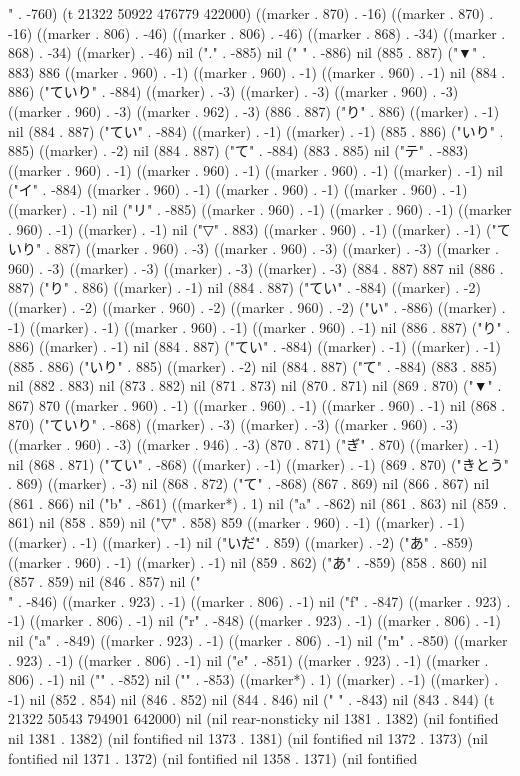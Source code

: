 " . -760) (t 21322 50922 476779 422000) ((marker . 870) . -16) ((marker . 870) . -16) ((marker . 806) . -46) ((marker . 806) . -46) ((marker . 868) . -34) ((marker . 868) . -34) ((marker) . -46) nil ("." . -885) nil (" " . -886) nil (885 . 887) ("▼" . 883) 886 ((marker . 960) . -1) ((marker . 960) . -1) ((marker . 960) . -1) nil (884 . 886) ("ていり" . -884) ((marker) . -3) ((marker) . -3) ((marker . 960) . -3) ((marker . 960) . -3) ((marker . 962) . -3) (886 . 887) ("り" . 886) ((marker) . -1) nil (884 . 887) ("てい" . -884) ((marker) . -1) ((marker) . -1) (885 . 886) ("いり" . 885) ((marker) . -2) nil (884 . 887) ("て" . -884) (883 . 885) nil ("テ" . -883) ((marker . 960) . -1) ((marker . 960) . -1) ((marker . 960) . -1) ((marker) . -1) nil ("イ" . -884) ((marker . 960) . -1) ((marker . 960) . -1) ((marker . 960) . -1) ((marker) . -1) nil ("リ" . -885) ((marker . 960) . -1) ((marker . 960) . -1) ((marker . 960) . -1) ((marker) . -1) nil ("▽" . 883) ((marker . 960) . -1) ((marker) . -1) ("ていり" . 887) ((marker . 960) . -3) ((marker . 960) . -3) ((marker) . -3) ((marker . 960) . -3) ((marker) . -3) ((marker) . -3) ((marker) . -3) (884 . 887) 887 nil (886 . 887) ("り" . 886) ((marker) . -1) nil (884 . 887) ("てい" . -884) ((marker) . -2) ((marker) . -2) ((marker . 960) . -2) ((marker . 960) . -2) ("い" . -886) ((marker) . -1) ((marker) . -1) ((marker . 960) . -1) ((marker . 960) . -1) nil (886 . 887) ("り" . 886) ((marker) . -1) nil (884 . 887) ("てい" . -884) ((marker) . -1) ((marker) . -1) (885 . 886) ("いり" . 885) ((marker) . -2) nil (884 . 887) ("て" . -884) (883 . 885) nil (882 . 883) nil (873 . 882) nil (871 . 873) nil (870 . 871) nil (869 . 870) ("▼" . 867) 870 ((marker . 960) . -1) ((marker . 960) . -1) ((marker . 960) . -1) nil (868 . 870) ("ていり" . -868) ((marker) . -3) ((marker) . -3) ((marker . 960) . -3) ((marker . 960) . -3) ((marker . 946) . -3) (870 . 871) ("ぎ" . 870) ((marker) . -1) nil (868 . 871) ("てい" . -868) ((marker) . -1) ((marker) . -1) (869 . 870) ("きとう" . 869) ((marker) . -3) nil (868 . 872) ("て" . -868) (867 . 869) nil (866 . 867) nil (861 . 866) nil ("b" . -861) ((marker*) . 1) nil ("a" . -862) nil (861 . 863) nil (859 . 861) nil (858 . 859) nil ("▽" . 858) 859 ((marker . 960) . -1) ((marker) . -1) ((marker) . -1) ((marker) . -1) nil ("いだ" . 859) ((marker) . -2) ("あ" . -859) ((marker . 960) . -1) ((marker) . -1) nil (859 . 862) ("あ" . -859) (858 . 860) nil (857 . 859) nil (846 . 857) nil ("\\" . -846) ((marker . 923) . -1) ((marker . 806) . -1) nil ("f" . -847) ((marker . 923) . -1) ((marker . 806) . -1) nil ("r" . -848) ((marker . 923) . -1) ((marker . 806) . -1) nil ("a" . -849) ((marker . 923) . -1) ((marker . 806) . -1) nil ("m" . -850) ((marker . 923) . -1) ((marker . 806) . -1) nil ("e" . -851) ((marker . 923) . -1) ((marker . 806) . -1) nil ("{" . -852) nil ("}" . -853) ((marker*) . 1) ((marker) . -1) ((marker) . -1) nil (852 . 854) nil (846 . 852) nil (844 . 846) nil (" " . -843) nil (843 . 844) (t 21322 50543 794901 642000) nil (nil rear-nonsticky nil 1381 . 1382) (nil fontified nil 1381 . 1382) (nil fontified nil 1373 . 1381) (nil fontified nil 1372 . 1373) (nil fontified nil 1371 . 1372) (nil fontified nil 1358 . 1371) (nil fontified 